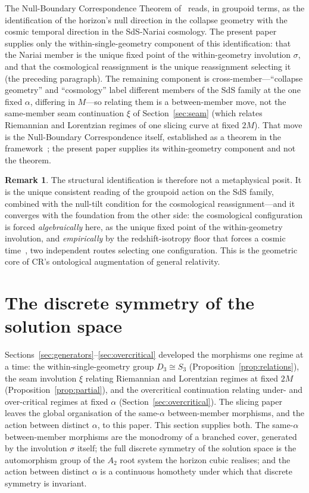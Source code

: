 \documentclass[11pt,a4paper]{article}
\theoremstyle{definition}
\newtheorem{remark}[theorem]{Remark}
\begin{document}
The Null-Boundary Correspondence Theorem of~\cite{JanzenCRframework} reads, in groupoid terms, as the identification of the horizon's null direction in the collapse geometry with the cosmic temporal direction in the SdS-Nariai cosmology. The present paper supplies only the within-single-geometry component of this identification: that the Nariai member is the unique fixed point of the within-geometry involution $\sigma$, and that the cosmological reassignment is the unique reassignment selecting it (the preceding paragraph). The remaining component is cross-member---``collapse geometry'' and ``cosmology'' label different members of the SdS family at the one fixed $\alpha$, differing in $M$---so relating them is a between-member move, not the same-member seam continuation $\xi$ of Section~\ref{sec:seam} (which relates Riemannian and Lorentzian regimes of one slicing curve at fixed $2M$). That move is the Null-Boundary Correspondence itself, established as a theorem in the framework~\cite{JanzenCRframework}; the present paper supplies its within-geometry component and not the theorem.

\begin{remark}\label{rem:cosmology}
The structural identification is therefore not a metaphysical posit. It is the unique consistent reading of the groupoid action on the SdS family, combined with the null-tilt condition for the cosmological reassignment---and it converges with the foundation from the other side: the cosmological configuration is forced \emph{algebraically} here, as the unique fixed point of the within-geometry involution, and \emph{empirically} by the redshift-isotropy floor that forces a cosmic time~\cite{JanzenModernParallax}, two independent routes selecting one configuration. This is the geometric core of CR's ontological augmentation of general relativity.
\end{remark}

\section{The discrete symmetry of the solution space}\label{sec:classification}

Sections~\ref{sec:generators}--\ref{sec:overcritical} developed the morphisms one regime at a time: the within-single-geometry group $D_{3}\cong S_{3}$ (Proposition~\ref{prop:relations}), the seam involution $\xi$ relating Riemannian and Lorentzian regimes at fixed $2M$ (Proposition~\ref{prop:partial}), and the overcritical continuation relating under- and over-critical regimes at fixed $\alpha$ (Section~\ref{sec:overcritical}). The slicing paper leaves the global organisation of the same-$\alpha$ between-member morphisms, and the action between distinct $\alpha$, to this paper. This section supplies both. The same-$\alpha$ between-member morphisms are the
monodromy of a branched cover, generated by the involution $\sigma$ itself; the full discrete symmetry of the solution space is the automorphism group of the $A_{2}$ root system the horizon cubic realises; and the action between distinct $\alpha$ is a continuous homothety under which that discrete symmetry is invariant.
\end{document}
